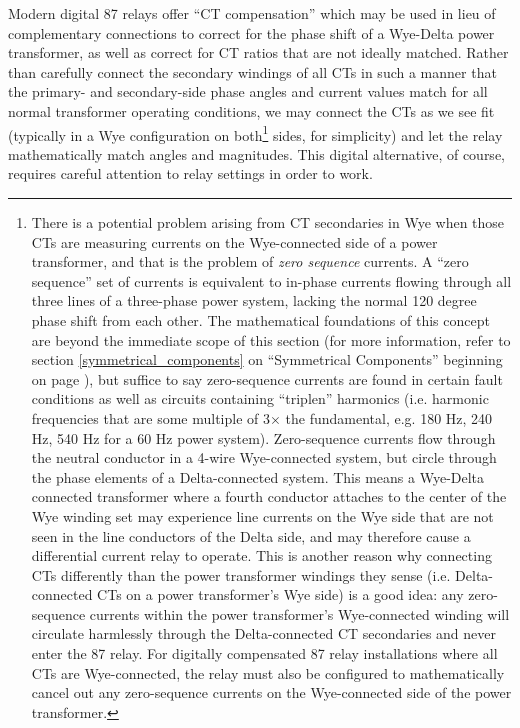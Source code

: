 Modern digital 87 relays offer ``CT compensation'' which may be used in lieu of complementary connections to correct for the phase shift of a Wye-Delta power transformer, as well as correct for CT ratios that are not ideally matched.  Rather than carefully connect the secondary windings of all CTs in such a manner that the primary- and secondary-side phase angles and current values match for all normal transformer operating conditions, we may connect the CTs as we see fit (typically in a Wye configuration on both\footnote{There is a potential problem arising from CT secondaries in Wye when those CTs are measuring currents on the Wye-connected side of a power transformer, and that is the problem of \textit{zero sequence} currents.  A ``zero sequence'' set of currents is equivalent to in-phase currents flowing through all three lines of a three-phase power system, lacking the normal 120 degree phase shift from each other.  The mathematical foundations of this concept are beyond the immediate scope of this section (for more information, refer to section \ref{symmetrical_components} on ``Symmetrical Components'' beginning on page \pageref{symmetrical_components}), but suffice to say zero-sequence currents are found in certain fault conditions as well as circuits containing ``triplen'' harmonics (i.e. harmonic frequencies that are some multiple of 3$\times$ the fundamental, e.g. 180 Hz, 240 Hz, 540 Hz for a 60 Hz power system).  Zero-sequence currents flow through the neutral conductor in a 4-wire Wye-connected system, but circle through the phase elements of a Delta-connected system.  This means a Wye-Delta connected transformer where a fourth conductor attaches to the center of the Wye winding set may experience line currents on the Wye side that are not seen in the line conductors of the Delta side, and may therefore cause a differential current relay to operate.  This is another reason why connecting CTs differently than the power transformer windings they sense (i.e. Delta-connected CTs on a power transformer's Wye side) is a good idea: any zero-sequence currents within the power transformer's Wye-connected winding will circulate harmlessly through the Delta-connected CT secondaries and never enter the 87 relay.  For digitally compensated 87 relay installations where all CTs are Wye-connected, the relay must also be configured to mathematically cancel out any zero-sequence currents on the Wye-connected side of the power transformer.} sides, for simplicity) and let the relay mathematically match angles and magnitudes.  This digital alternative, of course, requires careful attention to relay settings in order to work.    







